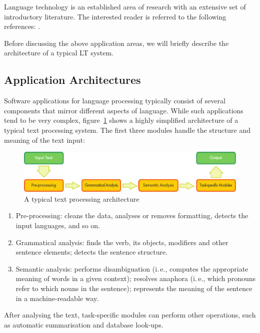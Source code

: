 \begin{multicols}{2}
Language technology is an established area of research with an extensive set of introductory literature. The interested reader is referred to the following references:  \cite{carstensen-etal1, jurafsky-martin01, manning-schuetze1, lt-world1, lt-survey1}.

Before discussing the above application areas, we will briefly describe the architecture of a typical LT system.

\subsection{Application Architectures}

Software applications for language processing typically consist of several components that mirror different aspects of language. While such applications tend to be very complex, figure~\ref{fig:textprocessingarch_en} shows a highly simplified architecture of a typical text processing system. The first three modules handle the structure and meaning of the text input:

\begin{figure}[hb]
  \center
  \includegraphics[width=\textwidth]{../_media/english/text_processing_app_architecture}
  \caption{A typical text processing architecture}
  \label{fig:textprocessingarch_en}
\end{figure}

\begin{enumerate}
\item Pre-processing: cleans the data, analyses or removes formatting, detects the input languages, and so on.
\item Grammatical analysis: finds the verb, its objects, modifiers and other sentence elements; detects the sentence structure.
\item Semantic analysis: performs disambiguation (i.\,e., computes the appropriate meaning of words in a given context); resolves anaphora (i.\,e., which pronouns refer to which nouns in the sentence); represents the meaning of the sentence in a machine-readable way.
\end{enumerate}

After analysing the text, task-specific modules can perform other operations, such as automatic summarisation and database look-ups.


\end{multicols}

